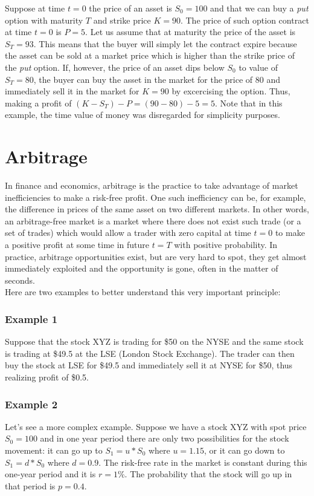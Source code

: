 \documentclass[times, utf8, diplomski]{fer}
\begin{document}
\hfill \break
\indent \noindent Suppose at time $t=0$ the price of an asset is $S_0 = 100$ and that we can buy a \textit{put} option with maturity $T$ and strike price $K=90$. The price of such option contract at time $t=0$ is $P = 5$. Let us assume that at maturity the price of the asset is $S_T = 93$. This means that the buyer will simply let the contract expire because the asset can be sold at a market price which is higher than the strike price of the \textit{put} option. If, however, the price of an asset dips below $S_0$ to value of $S_T = 80$, the buyer can buy the asset in the market for the price of $80$ and immediately sell it in the market for $K=90$ by excercising the option. Thus, making a profit of $(K-S_T) - P = (90 - 80) - 5 = 5$. 
\hfill \break
Note that in this example, the time value of money was disregarded for simplicity purposes. 

\section{Arbitrage}
In finance and economics, arbitrage is the practice to take advantage of market inefficiencies to make a risk-free profit. One such inefficiency can be, for example, the difference in prices of the same asset on two different markets. In other words, an arbitrage-free market is a market where there does not exist such trade (or a set of trades) which would allow a trader with zero capital at time $t=0$ to make a positive profit at some time in future $t=T$ with positive probability. In practice, arbitrage opportunities exist, but are very hard to spot, they get almost immediately exploited and the opportunity is gone, often in the matter of seconds.\\Here are two examples to better understand this very important principle:
\subsubsection{Example 1}
Suppose that the stock XYZ is trading for \$50 on the NYSE and the same stock is trading at \$49.5 at the LSE (London Stock Exchange). The trader can then buy the stock at LSE for \$49.5 and immediately sell it at NYSE for \$50, thus realizing profit of \$0.5. 
\subsubsection{Example 2}
Let's see a more complex example. Suppose we have a stock XYZ with spot price $S_0 = 100$ and in one year period there are only two possibilities for the stock movement: it can go up to $S_1 = u * S_0$ where $u=1.15$, or it can go down to $S_1 = d * S_0$ where $d=0.9$. The risk-free rate in the market is constant during this one-year period and it is $r=1\%$. The probability that the stock will go up in that period is $p=0.4$. 
\end{document}
